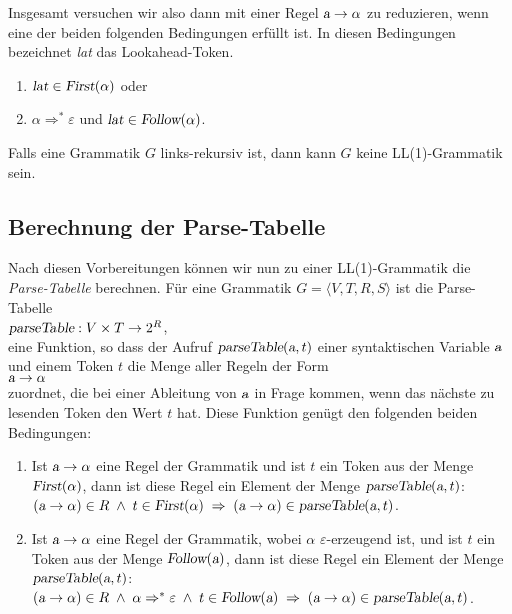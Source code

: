 Insgesamt versuchen wir also dann mit einer Regel $\textsl{a} \rightarrow \alpha$ zu reduzieren,
wenn eine der beiden folgenden Bedingungen erf\"ullt ist.  In diesen Bedingungen bezeichnet
\textsl{lat} das Lookahead-Token.
\begin{enumerate}
\item $\textsl{lat} \in \textsl{First}(\alpha)$ \quad oder
\item $\alpha \Rightarrow^* \varepsilon$ und $\textsl{lat} \in \textsl{Follow}(\alpha)$.
\end{enumerate}

\remark
Falls eine Grammatik $G$ links-rekursiv ist, dann kann $G$ keine LL(1)-Grammatik sein.


\subsection{Berechnung der Parse-Tabelle}
Nach diesen Vorbereitungen k\"onnen wir nun zu einer LL(1)-Grammatik die \emph{Parse-Tabelle}
berechnen.  F\"ur eine Grammatik $G = \langle V, T, R, S \rangle$ ist die Parse-Tabelle
\\[0.2cm]
\hspace*{1.3cm}
$\textsl{parseTable}: V \times T \rightarrow 2^R$,
\\[0.2cm]
eine Funktion, so dass der Aufruf $\textsl{parseTable}(\textsl{a},t)$ einer syntaktischen Variable $\textsl{a}$ und
einem Token $t$ die Menge aller Regeln der Form  
\\[0.2cm]
\hspace*{1.3cm}
$\textsl{a} \rightarrow \alpha$
\\[0.2cm]
zuordnet, die bei einer Ableitung von $\textsl{a}$ in Frage kommen, wenn das n\"achste zu lesenden Token den
Wert $t$ hat.  Diese Funktion gen\"ugt den folgenden beiden Bedingungen:
\begin{enumerate}
\item Ist  $\textsl{a} \rightarrow \alpha$ eine Regel der Grammatik und ist $t$ ein Token aus der Menge 
      $\textsl{First}(\alpha)$, dann ist diese Regel ein Element der Menge
      $\textsl{parseTable}(\textsl{a},t)$:
      \\[0.2cm]
      \hspace*{1.3cm}
      $(\textsl{a} \rightarrow \alpha) \in R \; \wedge \; t \in \textsl{First}(\alpha) 
      \;\Rightarrow\; (\textsl{a} \rightarrow \alpha) \in \textsl{parseTable}(\textsl{a},t)$.
\item Ist $\textsl{a} \rightarrow \alpha$ eine Regel der Grammatik, wobei $\alpha$ 
      $\varepsilon$-erzeugend ist, und ist $t$ ein Token aus der Menge 
      $\textsl{Follow}(\textsl{a})$, dann ist diese Regel ein Element der Menge
      $\textsl{parseTable}(\textsl{a},t)$:
      \\[0.2cm]
      \hspace*{1.3cm}
      $(\textsl{a} \rightarrow \alpha) \in R \; \wedge \; \alpha \Rightarrow^* \varepsilon 
       \;\wedge\;t \in \textsl{Follow}(\textsl{a}) 
       \;\Rightarrow\; (\textsl{a} \rightarrow \alpha) \in \textsl{parseTable}(\textsl{a},t)$.
\end{enumerate}
